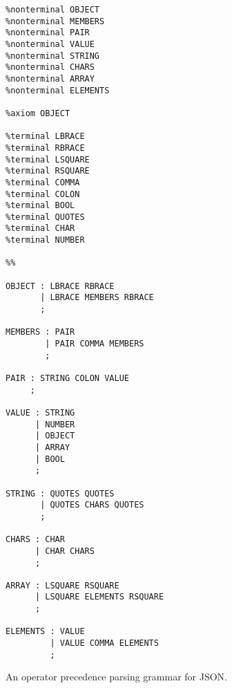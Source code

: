\begin{listing}[H]
\begin{verbatim}
%nonterminal OBJECT
%nonterminal MEMBERS
%nonterminal PAIR
%nonterminal VALUE
%nonterminal STRING
%nonterminal CHARS
%nonterminal ARRAY
%nonterminal ELEMENTS

%axiom OBJECT

%terminal LBRACE
%terminal RBRACE
%terminal LSQUARE
%terminal RSQUARE
%terminal COMMA
%terminal COLON
%terminal BOOL
%terminal QUOTES
%terminal CHAR
%terminal NUMBER

%%

OBJECT : LBRACE RBRACE
       | LBRACE MEMBERS RBRACE
       ;

MEMBERS : PAIR
        | PAIR COMMA MEMBERS
        ;

PAIR : STRING COLON VALUE
     ;

VALUE : STRING
      | NUMBER
      | OBJECT
      | ARRAY
      | BOOL
      ;

STRING : QUOTES QUOTES
       | QUOTES CHARS QUOTES
       ;

CHARS : CHAR
      | CHAR CHARS
      ;

ARRAY : LSQUARE RSQUARE
      | LSQUARE ELEMENTS RSQUARE
      ;

ELEMENTS : VALUE
         | VALUE COMMA ELEMENTS
         ;
\end{verbatim}
\caption{An operator precedence parsing grammar for JSON.}
\label{lst:json_grammar}
\end{listing}


